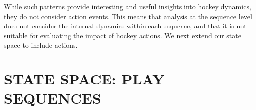 \documentclass[]{article}
\begin{document}
\begin{enumerate}
\end{enumerate}

While such patterns provide interesting and useful insights into hockey dynamics, they do not consider action events. This means that analysis at the sequence level does not consider the internal dynamics within each sequence, and that it is not suitable for evaluating the impact of hockey actions. We next extend our state space to include actions.

\section{STATE SPACE: PLAY SEQUENCES}
\label{sec:play-sequences}
\end{document}

